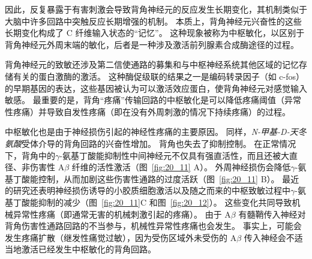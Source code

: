 因此，反复暴露于有害刺激会导致背角神经元的反应发生长期变化，其机制类似于大脑中许多回路中突触反应长期增强的机制。
本质上，背角神经元兴奋性的这些长期变化构成了 C 纤维输入状态的“记忆”。
这种现象被称为中枢敏化，以区别于背角神经元外周末端的敏化，后者是一种涉及激活前列腺素合成酶途径的过程。


背角神经元的致敏还涉及第二信使通路的募集和与中枢神经系统其他区域的记忆存储有关的蛋白激酶的激活。
这种酶促级联的结果之一是编码转录因子（如 c-fos）的早期基因的表达，这些基因被认为可以激活效应蛋白，使背角神经元对感觉输入敏感。
最重要的是，背角“疼痛”传输回路的中枢敏化是可以降低疼痛阈值（异常性疼痛）并导致自发性疼痛（即在没有外周刺激的情况下持续疼痛）的过程。


中枢敏化也是由于神经损伤引起的神经性疼痛的主要原因。
同样，\textit{N-甲基-D-天冬氨酸}受体介导的背角回路的兴奋性增加。
背角也失去了抑制控制。
在正常情况下，背角中的$\gamma$-氨基丁酸能抑制性中间神经元不仅具有强直活性，而且还被大直径、非伤害性 A$ \beta $ 纤维的活性激活（图~\ref{fig:20_11} A）。
外周神经损伤会降低$\gamma$-氨基丁酸能控制，从而加剧这些伤害性通路的过度活跃（图~\ref{fig:20_11} B）。
最近的研究还表明神经损伤诱导的小胶质细胞激活以及随之而来的中枢致敏过程中$\gamma$-氨基丁酸能抑制的减少（图~\ref{fig:20_11}C 和图~\ref{fig:20_12}）。
这些变化共同导致机械异常性疼痛（即通常无害的机械刺激引起的疼痛）。
由于 A$ \beta $ 有髓鞘传入神经对背角伤害性通路回路的不当参与，机械性异常性疼痛也会发生。
事实上，可能会发生疼痛扩散（继发性痛觉过敏），因为受伤区域外未受伤的 A$ \beta $ 传入神经会不适当地激活已经发生中枢敏化的背角回路。


